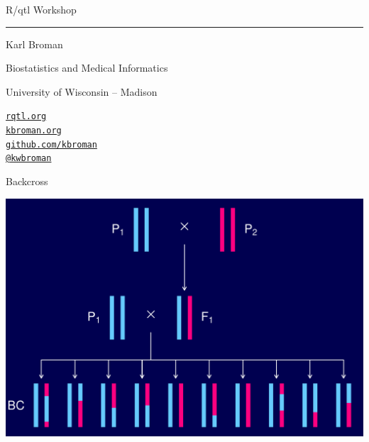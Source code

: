 \documentclass[12pt]{article}
\newcommand{\titlesize}{\fontsize{40}{50} \selectfont}
\newcommand{\headsize}{\fontsize{35}{35} \selectfont}
\newcommand{\textsize}{\fontsize{30}{35} \selectfont}
\newcommand{\smallsize}{\fontsize{25}{30} \selectfont}
\begin{document}
\thispagestyle{empty}

\begin{center}
\titlesize \color{myyellow}


\vspace*{15mm}

R/qtl Workshop

\color{mypink}
\rule{10in}{1mm}

\vspace{5mm}

\textsize \color{myblue}
Karl Broman
\vspace{5mm}

\color{mywhite}
{\smallsize Biostatistics and Medical Informatics

University of Wisconsin -- Madison
\vspace{20mm}


\href{http://rqtl.org}{\tt rqtl.org} \\[3pt]
\href{http://kbroman.org}{\tt kbroman.org} \\[3pt]
\href{https://github.com/kbroman}{\tt github.com/kbroman} \\
\href{https://twitter.com/kwbroman}{\tt @kwbroman}
}

\end{center}

\newpage

\headsize \color{myyellow}
\hfill \begin{minipage}{5.75in}
\centering
Backcross
\end{minipage}

\vfill

\centerline{\includegraphics{FigsA/backcross.pdf}}

\newpage
\end{document}
